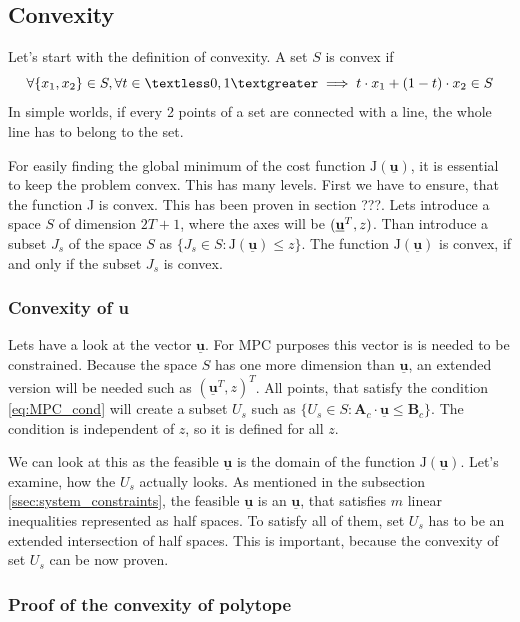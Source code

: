 \documentclass[a4paper,11pt,titlepage]{article}
\newcommand{\uvec}{\textbf{\underline{u}}}
\begin{document}
\subsection{Convexity}
\label{sec:convexity}
Let's start with the definition of convexity. A set $S$ is convex if
\begin{equation}
\label{eq:convexity_definition}
\forall\{x_1, x_2\} \in S, \forall t \in  \textless 0, 1 \textgreater \implies t \cdot x_1 + (1-t) \cdot x_2 \in S
\end{equation}
In simple worlds, if every 2 points of a set are connected with a line, the whole line has to belong to the set.

For easily finding the global minimum of the cost function $\mathrm{J}(\underline{\textbf{u}})$, it is essential to keep the problem convex. This has many levels. First we have to ensure, that the function J is convex. This has been proven in section ???. Lets introduce a space $S$ of dimension $2T+1$, where the axes will be $(\uvec^T, z)$. Than introduce a subset $J_s$ of the space $S$ as $\{J_s \in S : \mathrm{J}(\underline{\textbf{u}}) \leq z\}$. The function $\mathrm{J}(\underline{\textbf{u}})$ is convex, if and only if the subset $J_s$ is convex. 
\subsubsection{Convexity of u}
Lets have a look at the vector $\underline{\textbf{u}}$. For MPC purposes this vector is is needed to be constrained. Because the space $S$ has one more dimension than $\underline{\textbf{u}}$, an extended version will be needed such as $(\underline{\textbf{u}}^T, z)^T$.
All points, that satisfy the condition \ref{eq:MPC_cond} will create a subset $U_s$ such as $\{U_s \in S : \textbf{A}_c \cdot \underline{\textbf{u}} \leq \textbf{B}_c\}$. The condition is independent of $z$, so it is defined for all $z$. 

We can look at this as the feasible $\underline{\textbf{u}}$ is the domain of the function $\mathrm{J}(\underline{\textbf{u}})$. Let's examine, how the $U_s$ actually looks. As mentioned in the subsection \ref{ssec:system_constraints}, the feasible $\underline{\textbf{u}}$ is an $\underline{\textbf{u}}$, that satisfies $m$ linear inequalities represented as half spaces. To satisfy all of them, set $U_s$ has to be an extended intersection of half spaces. This is important, because the convexity of set $U_s$ can be now proven. 

\subsubsection{Proof of the convexity of polytope}
\end{document}
